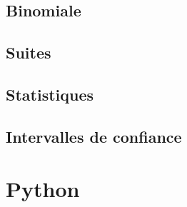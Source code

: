 \documentclass[a4paper,12pt]{book}
\begin{document}
\chapter{Binomiale}


\chapter{Suites}


\chapter{Statistiques}


\chapter{Intervalles de confiance}



\part{Python}


%







\printnomenclature

\printindex
\end{document}
